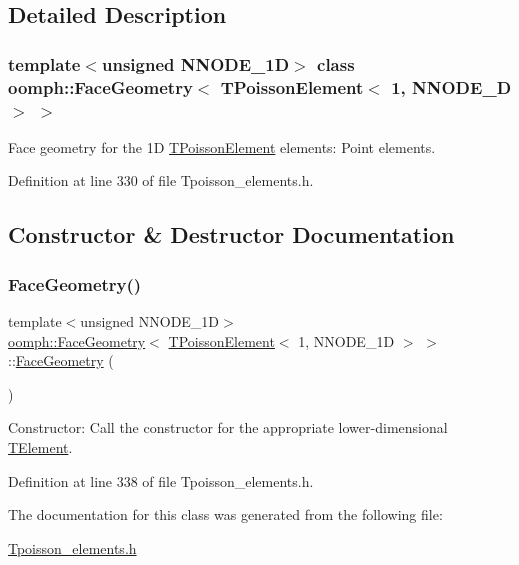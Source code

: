\subsection{Detailed Description}
\subsubsection*{template$<$unsigned N\+N\+O\+D\+E\+\_\+1D$>$\newline
class oomph\+::\+Face\+Geometry$<$ T\+Poisson\+Element$<$ 1, N\+N\+O\+D\+E\+\_\+D $>$ $>$}

Face geometry for the 1D \hyperlink{classoomph_1_1TPoissonElement}{T\+Poisson\+Element} elements\+: Point elements. 

Definition at line 330 of file Tpoisson\+\_\+elements.\+h.



\subsection{Constructor \& Destructor Documentation}
\mbox{\label{classoomph_1_1FaceGeometry_3_01TPoissonElement_3_011_00_01NNODE__1D_01_4_01_4_a41307cb1340612c68be7024d92f2a467}} 
\subsubsection{\texorpdfstring{Face\+Geometry()}{FaceGeometry()}}
{\footnotesize\ttfamily template$<$unsigned N\+N\+O\+D\+E\+\_\+1D$>$ \\
\hyperlink{classoomph_1_1FaceGeometry}{oomph\+::\+Face\+Geometry}$<$ \hyperlink{classoomph_1_1TPoissonElement}{T\+Poisson\+Element}$<$ 1, N\+N\+O\+D\+E\+\_\+1D $>$ $>$\+::\hyperlink{classoomph_1_1FaceGeometry}{Face\+Geometry} (\begin{DoxyParamCaption}{ }\end{DoxyParamCaption})\hspace{0.3cm}{\ttfamily [inline]}}



Constructor\+: Call the constructor for the appropriate lower-\/dimensional \hyperlink{classoomph_1_1TElement}{T\+Element}. 



Definition at line 338 of file Tpoisson\+\_\+elements.\+h.



The documentation for this class was generated from the following file\+:\begin{DoxyCompactItemize}
\item 
\hyperlink{Tpoisson__elements_8h}{Tpoisson\+\_\+elements.\+h}\end{DoxyCompactItemize}
